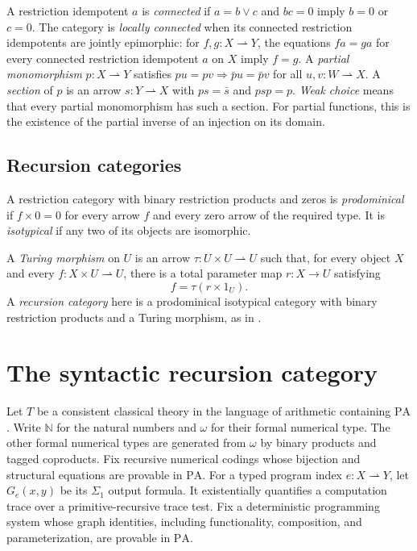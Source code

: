 \documentclass[11pt]{article}
\newcommand{\N}{\mathbb N}
\newcommand{\PA}{\mathrm{PA}}
\begin{document}
A restriction idempotent $a$ is \emph{connected} if $a=b\vee c$ and $bc=0$
imply $b=0$ or $c=0$. The category is \emph{locally connected}
when its connected restriction idempotents are jointly epimorphic: for
$f,g:X\rightharpoonup Y$, the equations $fa=ga$ for every connected
restriction idempotent $a$ on $X$ imply $f=g$.
A \emph{partial monomorphism} $p:X\rightharpoonup Y$ satisfies
$pu=pv\Rightarrow\bar p u=\bar p v$ for all
$u,v:W\rightharpoonup X$.
A \emph{section} of $p$ is an arrow $s:Y\rightharpoonup X$
with $ps=\bar s$ and $psp=p$.
\emph{Weak choice} means that every partial monomorphism has such
a section. For partial functions, this is the existence of the
partial inverse of an injection on its domain.

\subsection{Recursion categories}

A restriction category with binary restriction products and zeros is
\emph{prodominical} if $f\times0=0$ for every arrow $f$ and every
zero arrow of the required type. It is \emph{isotypical} if any
two of its objects are isomorphic.

A \emph{Turing morphism} on $U$ is an arrow
$\tau:U\times U\rightharpoonup U$ such that, for every object $X$
and every $f:X\times U\rightharpoonup U$, there is a total
parameter map $r:X\to U$ satisfying
\[
 f=\tau(r\times1_U).
\]
A \emph{recursion category} here is a prodominical isotypical
category with binary restriction products and a Turing morphism,
as in \cite[Section 9]{Heller}.

\section{The syntactic recursion category}\label{sec:syntactic}

Let $T$ be a consistent classical theory in the language of arithmetic
containing $\PA$. Write $\N$ for the natural numbers and $\omega$
for their formal numerical type. The other formal numerical types are
generated from $\omega$ by binary products and tagged coproducts.
Fix recursive numerical codings
whose bijection and structural equations are provable in $\PA$.
For a typed program index $e:X\rightharpoonup Y$, let $G_e(x,y)$ be its
$\Sigma_1$ output formula. It existentially quantifies a computation trace
over a primitive-recursive trace test. Fix a deterministic programming
system whose graph identities, including functionality, composition,
and parameterization, are provable in $\PA$.
\end{document}
